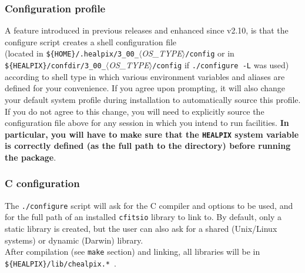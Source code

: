\documentclass[12pt,twoside]{article}
\begin{document}
\subsubsection{Configuration profile}
\label{subsub:conf}
A feature introduced in previous releases and enhanced since v2.10, is that 
the configure script creates a shell configuration file \hfill\\
(located in
{\tt \$\{HOME\}/.healpix/3\_00\_}{\em $\langle$OS\_TYPE$\rangle$}{\tt /config}
or in
\hfill\\
{\tt \$\{HEALPIX\}/confdir/3\_00\_}{\em $\langle$OS\_TYPE$\rangle$}{\tt /config}
if {\tt ./configure -L} was used)
according to shell
type in which various environment variables and aliases are defined
for your convenience. If you agree upon prompting, it will also
change your default system profile during installation to
automatically source this profile. If you do not agree to this change,
you will need to explicitly source the configuration file above for any session in
which you intend to run \healpix facilities. {\bf In particular, you will
have to make sure that the {\tt HEALPIX} system variable is correctly
defined (as the full path to the \healpix directory) before running
the package}.


\subsubsection{C configuration}

The {\tt ./configure} script will ask for the C compiler and options to
be used, and for the full path of an installed {\tt cfitsio} library to link to.
By default, only a static library is created, but the user can also ask for
 a shared (Unix/Linux systems) or dynamic (Darwin) library. \\
After compilation
(see {\tt make} section) and linking, all libraries will be 
in {\tt \$\{HEALPIX\}/lib/chealpix.*}\ .
\end{document}
